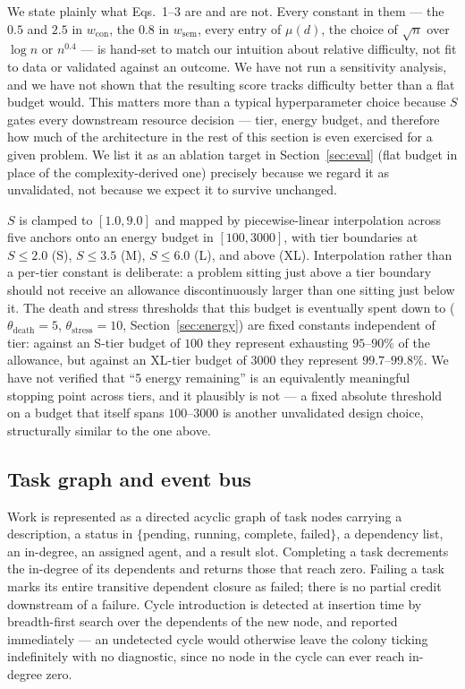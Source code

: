 \documentclass[11pt]{article}
\begin{document}
We state plainly what Eqs.~1--3 are and are not. Every constant in them ---
the $0.5$ and $2.5$ in $w_{\text{con}}$, the $0.8$ in $w_{\text{sem}}$, every
entry of $\mu(d)$, the choice of $\sqrt{n}$ over $\log n$ or $n^{0.4}$ --- is
hand-set to match our intuition about relative difficulty, not fit to data or
validated against an outcome. We have not run a sensitivity analysis, and we
have not shown that the resulting score tracks difficulty better than a flat
budget would. This matters more than a typical hyperparameter choice because
$S$ gates every downstream resource decision --- tier, energy budget, and
therefore how much of the architecture in the rest of this section is even
exercised for a given problem. We list it as an ablation target in
Section~\ref{sec:eval} (flat budget in place of the complexity-derived one)
precisely because we regard it as unvalidated, not because we expect it to
survive unchanged.

$S$ is clamped to $[1.0, 9.0]$ and mapped by piecewise-linear interpolation
across five anchors onto an energy budget in $[100, 3000]$, with tier
boundaries at $S \le 2.0$ (S), $S \le 3.5$ (M), $S \le 6.0$ (L), and above (XL).
Interpolation rather than a per-tier constant is deliberate: a problem sitting
just above a tier boundary should not receive an allowance discontinuously
larger than one sitting just below it. The death and stress thresholds that
this budget is eventually spent down to
($\theta_{\text{death}}=5$, $\theta_{\text{stress}}=10$, Section~\ref{sec:energy})
are fixed constants independent of tier: against an S-tier budget of $100$
they represent exhausting $95$--$90\%$ of the allowance, but against an
XL-tier budget of $3000$ they represent $99.7$--$99.8\%$. We have not verified
that ``5 energy remaining'' is an equivalently meaningful stopping point across
tiers, and it plausibly is not --- a fixed absolute threshold on a budget that
itself spans $100$--$3000$ is another unvalidated design choice, structurally
similar to the one above.

\subsection{Task graph and event bus}

Work is represented as a directed acyclic graph of task nodes carrying a
description, a status in $\{$pending, running, complete, failed$\}$, a
dependency list, an in-degree, an assigned agent, and a result slot. Completing
a task decrements the in-degree of its dependents and returns those that reach
zero. Failing a task marks its entire transitive dependent closure as failed;
there is no partial credit downstream of a failure. Cycle introduction is
detected at insertion time by breadth-first search over the dependents of the
new node, and reported immediately --- an undetected cycle would otherwise
leave the colony ticking indefinitely with no diagnostic, since no node in the
cycle can ever reach in-degree zero.
\end{document}
